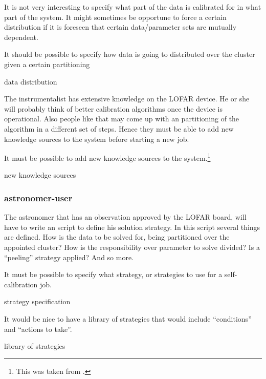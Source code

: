 \documentclass[]{lofar}
\begin{document}
        It is not very interesting to specify what part of the data is
        calibrated for in what part of the system. It might sometimes
        be opportune to force a certain distribution if it is foreseen
        that certain data/parameter sets are mutually dependent.

        \begin{requirement}
          It should be possible to specify how data is going to
          distributed over the cluster given a certain partitioning
          \caption{data distribution\label{req:data-distribution}}
        \end{requirement}

        The instrumentalist has extensive knowledge on the LOFAR
        device. He or she will probably think of better calibration
        algorithms once the device is operational. Also people like
        that may come up with an partitioning of the algorithm in a
        different set of steps. Hence they must be able to add new
        knowledge sources to the system before starting a new job.

        \begin{requirement}
          It must be possible to add new knowledge sources to the
          system.\protect\footnote{This was taken from \protect\cite{HOO03}.}
          \caption{new knowledge sources\label{req:knowledge-sources}}
        \end{requirement}

      \subsubsection{astronomer-user}

        The astronomer that has an observation approved by the LOFAR
        board, will have to write an script to define his solution
        strategy. In this script several things are defined. How is the data to be
        solved for, being partitioned over the appointed cluster? How
        is the responsibility over parameter to solve divided? Is a
        ``peeling'' strategy applied? And so more.

        \begin{requirement}
          It must be possible to specify what strategy, or strategies
          to use for a self-calibration job.
          \caption{strategy specification\label{req:strategy-specification}}
        \end{requirement}

        \begin{requirement}
          It would be nice to have a library of strategies that would
          include ``conditions'' and ``actions to take''.
          \footnotemark[\value{footnote}]
          \caption{library of strategies\label{req:strategies}}
        \end{requirement}
\end{document}
